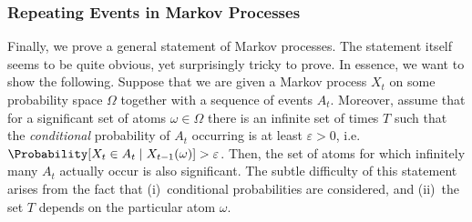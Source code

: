 \documentclass{article}
\begin{document}
\subsubsection*{Repeating Events in Markov Processes}
Finally, we prove a general statement of Markov processes.
The statement itself seems to be quite obvious, yet surprisingly tricky to prove.
In essence, we want to show the following.
Suppose that we are given a Markov process $X_t$ on some probability space $\Omega$ together with a sequence of events $A_t$.
Moreover, assume that for a significant set of atoms $\omega \in \Omega$ there is an infinite set of times $T$ such that the \emph{conditional} probability of $A_t$ occurring is at least $\varepsilon > 0$, i.e.\ $\Probability[X_t \in A_t \mid X_{t-1}(\omega)] > \varepsilon$.
Then, the set of atoms for which infinitely many $A_t$ actually occur is also significant.
The subtle difficulty of this statement arises from the fact that (i)~conditional probabilities are considered, and (ii)~the set $T$ depends on the particular atom $\omega$.
\end{document}
